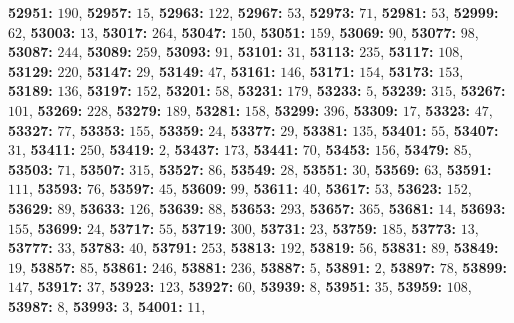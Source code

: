 \textsf{\bfseries 52951:} $190$, \textsf{\bfseries 52957:} $15$, \textsf{\bfseries 52963:} $122$, \textsf{\bfseries 52967:} $53$, \textsf{\bfseries 52973:} $71$, \textsf{\bfseries 52981:} $53$, \textsf{\bfseries 52999:} $62$, \textsf{\bfseries 53003:} $13$, \textsf{\bfseries 53017:} $264$, \textsf{\bfseries 53047:} $150$, \textsf{\bfseries 53051:} $159$, \textsf{\bfseries 53069:} $90$, \textsf{\bfseries 53077:} $98$, \textsf{\bfseries 53087:} $244$, \textsf{\bfseries 53089:} $259$, \textsf{\bfseries 53093:} $91$, \textsf{\bfseries 53101:} $31$, \textsf{\bfseries 53113:} $235$, \textsf{\bfseries 53117:} $108$, \textsf{\bfseries 53129:} $220$, \textsf{\bfseries 53147:} $29$, \textsf{\bfseries 53149:} $47$, \textsf{\bfseries 53161:} $146$, \textsf{\bfseries 53171:} $154$, \textsf{\bfseries 53173:} $153$, \textsf{\bfseries 53189:} $136$, \textsf{\bfseries 53197:} $152$, \textsf{\bfseries 53201:} $58$, \textsf{\bfseries 53231:} $179$, \textsf{\bfseries 53233:} $5$, \textsf{\bfseries 53239:} $315$, \textsf{\bfseries 53267:} $101$, \textsf{\bfseries 53269:} $228$, \textsf{\bfseries 53279:} $189$, \textsf{\bfseries 53281:} $158$, \textsf{\bfseries 53299:} $396$, \textsf{\bfseries 53309:} $17$, \textsf{\bfseries 53323:} $47$, \textsf{\bfseries 53327:} $77$, \textsf{\bfseries 53353:} $155$, \textsf{\bfseries 53359:} $24$, \textsf{\bfseries 53377:} $29$, \textsf{\bfseries 53381:} $135$, \textsf{\bfseries 53401:} $55$, \textsf{\bfseries 53407:} $31$, \textsf{\bfseries 53411:} $250$, \textsf{\bfseries 53419:} $2$, \textsf{\bfseries 53437:} $173$, \textsf{\bfseries 53441:} $70$, \textsf{\bfseries 53453:} $156$, \textsf{\bfseries 53479:} $85$, \textsf{\bfseries 53503:} $71$, \textsf{\bfseries 53507:} $315$, \textsf{\bfseries 53527:} $86$, \textsf{\bfseries 53549:} $28$, \textsf{\bfseries 53551:} $30$, \textsf{\bfseries 53569:} $63$, \textsf{\bfseries 53591:} $111$, \textsf{\bfseries 53593:} $76$, \textsf{\bfseries 53597:} $45$, \textsf{\bfseries 53609:} $99$, \textsf{\bfseries 53611:} $40$, \textsf{\bfseries 53617:} $53$, \textsf{\bfseries 53623:} $152$, \textsf{\bfseries 53629:} $89$, \textsf{\bfseries 53633:} $126$, \textsf{\bfseries 53639:} $88$, \textsf{\bfseries 53653:} $293$, \textsf{\bfseries 53657:} $365$, \textsf{\bfseries 53681:} $14$, \textsf{\bfseries 53693:} $155$, \textsf{\bfseries 53699:} $24$, \textsf{\bfseries 53717:} $55$, \textsf{\bfseries 53719:} $300$, \textsf{\bfseries 53731:} $23$, \textsf{\bfseries 53759:} $185$, \textsf{\bfseries 53773:} $13$, \textsf{\bfseries 53777:} $33$, \textsf{\bfseries 53783:} $40$, \textsf{\bfseries 53791:} $253$, \textsf{\bfseries 53813:} $192$, \textsf{\bfseries 53819:} $56$, \textsf{\bfseries 53831:} $89$, \textsf{\bfseries 53849:} $19$, \textsf{\bfseries 53857:} $85$, \textsf{\bfseries 53861:} $246$, \textsf{\bfseries 53881:} $236$, \textsf{\bfseries 53887:} $5$, \textsf{\bfseries 53891:} $2$, \textsf{\bfseries 53897:} $78$, \textsf{\bfseries 53899:} $147$, \textsf{\bfseries 53917:} $37$, \textsf{\bfseries 53923:} $123$, \textsf{\bfseries 53927:} $60$, \textsf{\bfseries 53939:} $8$, \textsf{\bfseries 53951:} $35$, \textsf{\bfseries 53959:} $108$, \textsf{\bfseries 53987:} $8$, \textsf{\bfseries 53993:} $3$, \textsf{\bfseries 54001:} $11$, 
